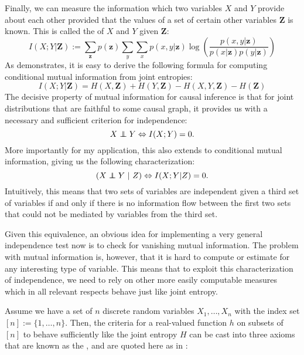 Finally, we can measure the information which two variables $X$ and $Y$ provide about each other provided that the values of a set of certain other variables $\mathbf{Z}$ is known. This is called the \textit{} of $X$ and $Y$ given $\mathbf{Z}$:
 \begin{equation}
  I(X;Y|\mathbf{Z}) := \sum_{\mathbf{z}} p(\mathbf{z}) \sum_{y} \sum_{x} p(x,y|\mathbf{z}) \log \left( \frac{p(x,y|\mathbf{z})}{p(x|\mathbf{z})p(y|\mathbf{z})} \right) 
 \end{equation}
As \cite{yeung2008} demonstrates, it is easy to derive the following formula for computing conditional mutual information from joint entropies:
\begin{equation}
 I(X;Y|\mathbf{Z}) = H(X,\mathbf{Z}) + H(Y,\mathbf{Z}) - H(X,Y,\mathbf{Z}) - H(\mathbf{Z})
\end{equation}
The decisive property of mutual information for causal inference is that for joint distributions that are faithful to some causal graph, it provides us with a necessary and sufficient criterion for independence:
\begin{equation}
 X \indep Y \Leftrightarrow I(X;Y) = 0.
\end{equation}
More importantly for my application, this also extends to conditional mutual information, giving us the following characterization:
\begin{equation}
 (X \indep Y\ |\ Z) \Leftrightarrow I(X;Y|Z) = 0.
\end{equation}
Intuitively, this means that two sets of variables are independent given a third set of variables if and only if there is no information flow between the first two sets that could not be mediated by variables from the third set.

Given this equivalence, an obvious idea for implementing a very general independence test now is to check for vanishing mutual information. The problem with mutual information is, however, that it is hard to compute or estimate for any interesting type of variable. This means that to exploit this characterization of independence, we need to rely on other more easily computable measures which in all relevant respects behave just like joint entropy.

Assume we have a set of $n$ discrete random variables $X_1,\dots,X_n$ with the index set $[n] := \{1,\dots,n\}$. Then, the criteria for a real-valued function $h$ on subsets of $[n]$ to behave sufficiently like the joint entropy $H$ can be cast into three axioms that are known as the \textit{}, and are quoted here as in \cite{chaves_ea_2014}:

